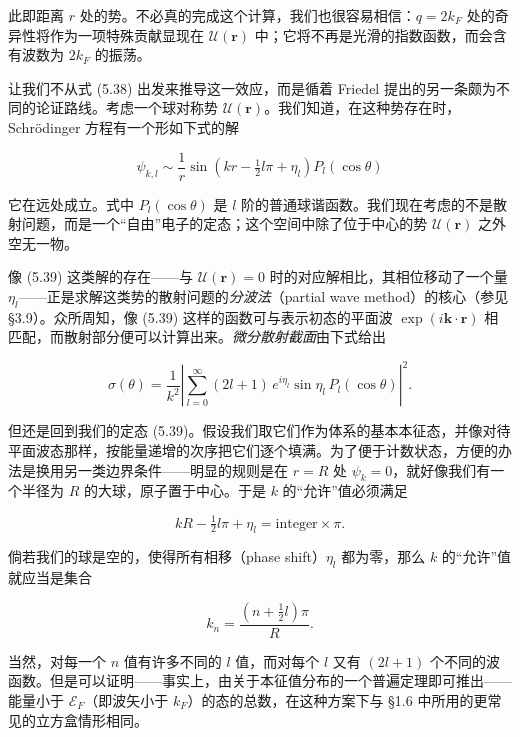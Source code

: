 此即距离 $r$ 处的势。不必真的完成这个计算，我们也很容易相信：$q = 2k_F$ 处的奇异性将作为一项特殊贡献显现在 $\mathcal{U}(\mathbf{r})$ 中；它将不再是光滑的指数函数，而会含有波数为 $2k_F$ 的振荡。

让我们不从式 (5.38) 出发来推导这一效应，而是循着 Friedel 提出的另一条颇为不同的论证路线。考虑一个球对称势 $\mathcal{U}(\mathbf{r})$。我们知道，在这种势存在时，Schrödinger 方程有一个形如下式的解

\begin{equation*}
\psi_{k,l} \sim \frac{1}{r} \sin\left( kr - \tfrac{1}{2}l\pi + \eta_l \right) P_l(\cos\theta)
\tag{5.39}
\end{equation*}

它在远处成立。式中 $P_l(\cos\theta)$ 是 $l$ 阶的普通球谐函数。我们现在考虑的不是散射问题，而是一个“自由”电子的定态；这个空间中除了位于中心的势 $\mathcal{U}(\mathbf{r})$ 之外空无一物。

像 (5.39) 这类解的存在——与 $\mathcal{U}(\mathbf{r}) = 0$ 时的对应解相比，其相位移动了一个量 $\eta_l$——正是求解这类势的散射问题的\emph{分波法}（partial wave method）的核心（参见 §3.9）。众所周知，像 (5.39) 这样的函数可与表示初态的平面波 $\exp(i\mathbf{k}\cdot\mathbf{r})$ 相匹配，而散射部分便可以计算出来。\emph{微分散射截面}由下式给出

\begin{equation*}
\sigma(\theta) = \frac{1}{k^2} \left| \sum_{l=0}^{\infty} (2l+1)\, e^{i\eta_l} \sin\eta_l \, P_l(\cos\theta) \right|^2 .
\tag{5.40}
\end{equation*}

但还是回到我们的定态 (5.39)。假设我们取它们作为体系的基本本征态，并像对待平面波态那样，按能量递增的次序把它们逐个填满。为了便于计数状态，方便的办法是换用另一类边界条件——明显的规则是在 $r = R$ 处 $\psi_k = 0$，就好像我们有一个半径为 $R$ 的大球，原子置于中心。于是 $k$ 的“允许”值必须满足

\begin{equation*}
kR - \tfrac{1}{2}l\pi + \eta_l = \text{integer} \times \pi .
\tag{5.41}
\end{equation*}

倘若我们的球是空的，使得所有相移（phase shift）$\eta_l$ 都为零，那么 $k$ 的“允许”值就应当是集合

\begin{equation*}
k_n = \frac{\left(n + \tfrac{1}{2}l\right)\pi}{R} .
\tag{5.42}
\end{equation*}

当然，对每一个 $n$ 值有许多不同的 $l$ 值，而对每个 $l$ 又有 $(2l+1)$ 个不同的波函数。但是可以证明——事实上，由关于本征值分布的一个普遍定理即可推出——能量小于 $\mathcal{E}_F$（即波矢小于 $k_F$）的态的总数，在这种方案下与 §1.6 中所用的更常见的立方盒情形相同。

